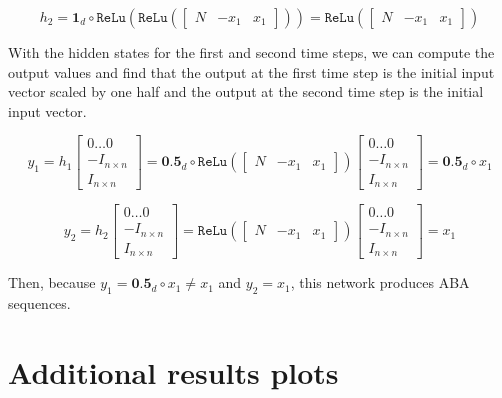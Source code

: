 \documentclass[12pt]{article}
\begin{document}
\[h_2 = \textbf{1}_d \circ \texttt{ReLu}(\texttt{ReLu} ( \begin{bmatrix} N & -x_1 & x_1 \end{bmatrix})) = \texttt{ReLu} ( \begin{bmatrix} N & -x_1 & x_1 \end{bmatrix})\]

With the hidden states for the first and second time steps, we can compute the output values and find that the output at the first time step is the initial input vector scaled by one half and the output at the second time step is the initial input vector.

\[y_1 = h_1\begin{bmatrix} 0 \dots 0 \\ -I_{n \times n} \\ I_{n \times n}  \end{bmatrix} = \textbf{0.5}_d\circ \texttt{ReLu} ( \begin{bmatrix} N & -x_1 & x_1 \end{bmatrix}) \begin{bmatrix} 0 \dots 0 \\ -I_{n \times n} \\ I_{n \times n}  \end{bmatrix} = \textbf{0.5}_d\circ x_1\]

\[y_2 = h_2\begin{bmatrix} 0 \dots 0 \\ -I_{n \times n} \\ I_{n \times n}  \end{bmatrix} = \texttt{ReLu} ( \begin{bmatrix} N & -x_1 & x_1 \end{bmatrix}) \begin{bmatrix} 0 \dots 0 \\ -I_{n \times n} \\ I_{n \times n}  \end{bmatrix} = x_1\]

Then, because $y_1 = \textbf{0.5}_d\circ x_1 \not = x_1$ and $y_2 = x_1$, this network produces ABA sequences.


\newpage

\section{Additional results plots}
\end{document}
